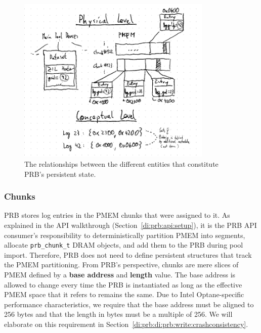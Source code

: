 \documentclass[12pt,a4paper,twoside]{book}
\begin{document}
\begin{figure}
    \centering
    \includegraphics[height=8cm]{fig/prb_physical_data_structure_entities}
    \caption{
        The relationships between the different entities that constitute PRB's persistent state.
    }
    \label{fig:prb_physical_data_structure_entities}
\end{figure}


\subsubsection{Chunks}\label{di:prb:persistent:chunks}
PRB stores log entries in the PMEM chunks that were assigned to it.
As explained in the API walkthrough (Section~\ref{di:prb:api:setup}), it is the PRB API consumer's responsibility to deterministically partition PMEM into segments, allocate \lstinline{prb_chunk_t} DRAM objects, and add them to the PRB during pool import.
Therefore, PRB does not need to define persistent structures that track the PMEM partitioning.
From PRB's perspective, chunks are mere slices of PMEM defined by a \textbf{base address} and \textbf{length} value.
The base address is allowed to change every time the PRB is instantiated as long as the effective PMEM space that it refers to remains the same.
Due to Intel Optane-specific performance characteristics, we require that the base address must be aligned to 256 bytes and that the length in bytes must be a multiple of 256.
We will elaborate on this requirement in Section~\ref{di:prb:di:prb:write:crashconsistency}.
\end{document}
